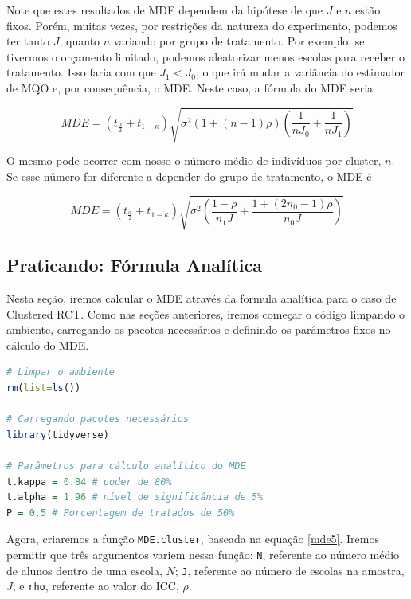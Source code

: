 Note que estes resultados de MDE dependem da hipótese de que $J$ e $n$ estão fixos. Porém, muitas vezes, por restrições da natureza do experimento, podemos ter tanto $J$, quanto $n$ variando por grupo de tratamento. Por exemplo, se tivermos o orçamento limitado, podemos aleatorizar menos escolas para receber o tratamento. Isso faria com que $J_1 < J_0$, o que irá mudar a variância do estimador de MQO e, por consequência, o MDE. Neste caso, a fórmula do MDE seria

\begin{equation}\label{mde6}
    MDE = (t_{\frac{\alpha}{2}} + t_{1-\kappa})\sqrt{\sigma^2(1 + (n-1)\rho)\left(\frac{1}{nJ_0}+\frac{1}{nJ_1}\right)}
\end{equation}

O mesmo pode ocorrer com nosso o número médio de indivíduos por cluster, $n$. Se esse número for diferente a depender do grupo de tratamento, o MDE é

\begin{equation}\label{mde7}
    MDE = (t_{\frac{\alpha}{2}} + t_{1-\kappa})\sqrt{\sigma^2\left(\frac{1-\rho}{n_1 J}+\frac{1+(2n_0 - 1)\rho}{n_0 J}\right)}
\end{equation}

\subsection{\sc Praticando: Fórmula Analítica}

Nesta seção, iremos calcular o MDE através da formula analítica para o caso de Clustered RCT. Como nas seções anteriores, iremos começar o código limpando o ambiente, carregando os pacotes necessários e definindo os parâmetros fixos no cálculo do MDE.


\begin{boxH}
\begin{lstlisting}[language = R]
# Limpar o ambiente 
rm(list=ls())

# Carregando pacotes necessários
library(tidyverse)

# Parâmetros para cálculo analítico do MDE
t.kappa = 0.84 # poder de 80%
t.alpha = 1.96 # nível de significância de 5%
P = 0.5 # Porcentagem de tratados de 50%
\end{lstlisting}
\end{boxH}

Agora, criaremos a função \texttt{MDE.cluster}, baseada na equação \eqref{mde5}. Iremos permitir que três argumentos variem nessa função: \texttt{N}, referente ao número médio de alunos dentro de uma escola, $N$; \texttt{J}, referente ao número de escolas na amostra, $J$; e \texttt{rho}, referente ao valor do ICC, $\rho$.


